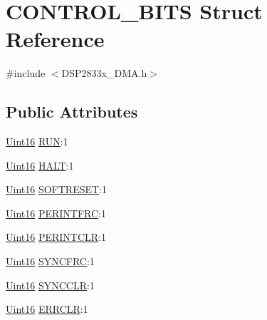 \hypertarget{struct_c_o_n_t_r_o_l___b_i_t_s}{}\section{C\+O\+N\+T\+R\+O\+L\+\_\+\+B\+I\+T\+S Struct Reference}
\label{struct_c_o_n_t_r_o_l___b_i_t_s}


{\ttfamily \#include $<$D\+S\+P2833x\+\_\+\+D\+M\+A.\+h$>$}

\subsection*{Public Attributes}
\begin{DoxyCompactItemize}
\item 
\hyperlink{_d_s_p2833x___device_8h_a59a9f6be4562c327cbfb4f7e8e18f08b}{Uint16} \hyperlink{struct_c_o_n_t_r_o_l___b_i_t_s_a8fd0261bf7cbaa8868eb130e206df83b}{R\+U\+N}\+:1
\item 
\hyperlink{_d_s_p2833x___device_8h_a59a9f6be4562c327cbfb4f7e8e18f08b}{Uint16} \hyperlink{struct_c_o_n_t_r_o_l___b_i_t_s_a04e08d927d287591e4fdbaa7c9cabea5}{H\+A\+L\+T}\+:1
\item 
\hyperlink{_d_s_p2833x___device_8h_a59a9f6be4562c327cbfb4f7e8e18f08b}{Uint16} \hyperlink{struct_c_o_n_t_r_o_l___b_i_t_s_a232addc775ce2568a103343e9ab07b83}{S\+O\+F\+T\+R\+E\+S\+E\+T}\+:1
\item 
\hyperlink{_d_s_p2833x___device_8h_a59a9f6be4562c327cbfb4f7e8e18f08b}{Uint16} \hyperlink{struct_c_o_n_t_r_o_l___b_i_t_s_ae6ab28ce5ac03c8bdaa671c8bc68817a}{P\+E\+R\+I\+N\+T\+F\+R\+C}\+:1
\item 
\hyperlink{_d_s_p2833x___device_8h_a59a9f6be4562c327cbfb4f7e8e18f08b}{Uint16} \hyperlink{struct_c_o_n_t_r_o_l___b_i_t_s_a2f132e2f45e5fdf79b1505d4896fff3d}{P\+E\+R\+I\+N\+T\+C\+L\+R}\+:1
\item 
\hyperlink{_d_s_p2833x___device_8h_a59a9f6be4562c327cbfb4f7e8e18f08b}{Uint16} \hyperlink{struct_c_o_n_t_r_o_l___b_i_t_s_a017644d8b8069e8127eb8a42734f2e0e}{S\+Y\+N\+C\+F\+R\+C}\+:1
\item 
\hyperlink{_d_s_p2833x___device_8h_a59a9f6be4562c327cbfb4f7e8e18f08b}{Uint16} \hyperlink{struct_c_o_n_t_r_o_l___b_i_t_s_a06cacfc5a466bd0e8ee54159380bc6f9}{S\+Y\+N\+C\+C\+L\+R}\+:1
\item 
\hyperlink{_d_s_p2833x___device_8h_a59a9f6be4562c327cbfb4f7e8e18f08b}{Uint16} \hyperlink{struct_c_o_n_t_r_o_l___b_i_t_s_a61bc381fc16d75c3bd8b387caa4de9d7}{E\+R\+R\+C\+L\+R}\+:1

\end{DoxyCompactItemize}
